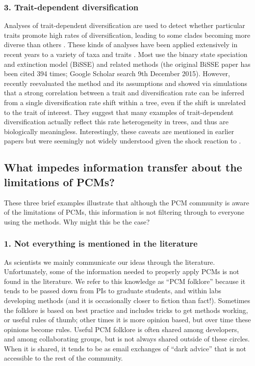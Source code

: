 \documentclass[a4paper,12pt]{article}
\begin{document}
\subsubsection{3. Trait-dependent diversification} 
Analyses of trait-dependent diversification are used to detect whether particular traits promote high rates of diversification, leading to some clades becoming more diverse than others \citep{nee1994reconstructed}. 
These kinds of analyses have been applied extensively in recent years to a variety of taxa and traits \citep[e.g.][]{Goldberg22102010,Price01052012,Givnish201455,ELE:ELE12168}.
Most use the binary state speciation and extinction model (BiSSE) and related methods (the original BiSSE paper \citet{maddison2007estimating} has been cited 394 times; Google Scholar search 9th December 2015).
However, \citet{rabosky2015model} recently reevaluated the method and its assumptions and showed via simulations that a strong correlation between a trait and diversification rate can be inferred from a single diversification rate shift within a tree, even if the shift is unrelated to the trait of interest.
They suggest that many examples of trait-dependent diversification actually reflect this rate heterogeneity in trees, and thus are biologically meaningless.
Interestingly, these caveats are mentioned in earlier papers \citep{maddison2007estimating,fitzjohn2010quantitative,FitzJohn:2012aa} but were seemingly not widely understood given the shock reaction to \citet{rabosky2015model}.

\subsection{What impedes information transfer about the limitations of PCMs?}
These three brief examples illustrate that although the PCM community is aware of the limitations of PCMs, this information is not filtering through to everyone using the methods. 
Why might this be the case?

  \subsubsection{1. Not everything is mentioned in the literature}
    As scientists we mainly communicate our ideas through the literature. 
    Unfortunately, some of the information needed to properly apply PCMs is not found in the literature. 
    We refer to this knowledge as ``PCM folklore'' because it tends to be passed down from PIs to graduate students, and within labs developing methods (and it is occasionally closer to fiction than fact!).
    Sometimes the folklore is based on best practice and includes tricks to get methods working, or useful rules of thumb; other times it is more opinion based, but over time these opinions become rules. 
    Useful PCM folklore is often shared among developers, and among collaborating groups, but is not always shared outside of these circles. 
    When it is shared, it tends to be as email exchanges of ``dark advice'' that is not accessible to the rest of the community.
\end{document}
